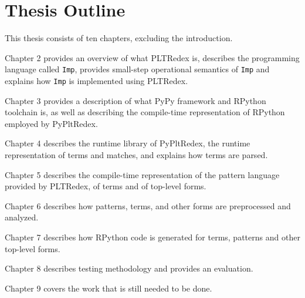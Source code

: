 \section{Thesis Outline}
This thesis consists of ten chapters, excluding the introduction.

Chapter 2 provides an overview of what PLTRedex is, describes the programming language called \texttt{Imp}, provides small-step operational semantics of \texttt{Imp} and explains how \texttt{Imp} is implemented using PLTRedex.

Chapter 3 provides a description of what PyPy framework and RPython toolchain is, as well as describing the compile-time representation of RPython employed by PyPltRedex.

Chapter 4 describes the runtime library of PyPltRedex, the runtime representation of terms and matches, and explains how terms are parsed.

Chapter 5 describes the compile-time representation of the pattern language provided by PLTRedex, of terms and of top-level forms.

Chapter 6 describes how patterns, terms, and other forms are preprocessed and analyzed.

Chapter 7 describes how RPython code is generated for terms, patterns and other top-level forms.

Chapter 8 describes testing methodology and provides an evaluation. 

Chapter 9 covers the work that is still needed to be done.
